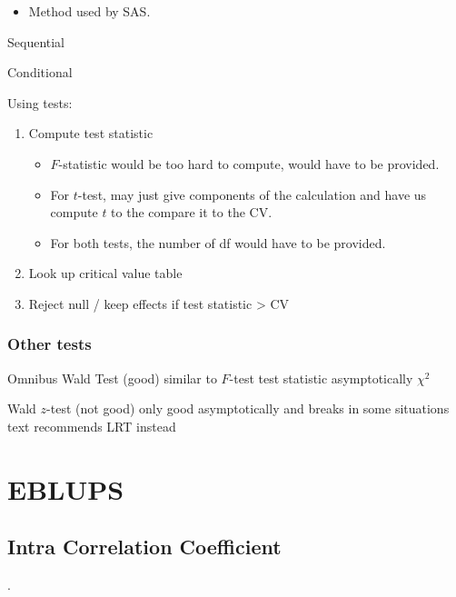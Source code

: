 \documentclass[english]{article}
\begin{document}
\begin{multicols*}{2}
\begin{definitionNOHFILL}[$F$-test]
\begin{definitionNOHFILLpropos}

\begin{itemize}
	\item	Method used by SAS.
\end{itemize}
\end{definitionNOHFILLpropos}

\begin{definitionNOHFILLsub}[Type $I$]
Sequential
\end{definitionNOHFILLsub}

\begin{definitionNOHFILLsub}
Conditional
\end{definitionNOHFILLsub}
\end{definitionNOHFILL}


Using tests:
\begin{enumerate}
	\item	Compute test statistic
		\begin{itemize}
		\item	$F$-statistic would be too hard to compute, would have to be provided.
		\item	For $t$-test, may just give components of the calculation and have us compute $t$ to the compare it to the CV.
		\item	For both tests, the number of df would have to be provided.
		\end{itemize}
	\item	Look up critical value table
	\item	Reject null / keep effects if test statistic > CV
\end{enumerate}

\subsubsection{Other tests}
Omnibus Wald Test (good)
	similar to $F$-test
	test statistic asymptotically $\chi^{2}$
	

Wald $z$-test (not good)
	only good asymptotically and breaks in some situations
	text recommends LRT instead	
	
	
	
\section{EBLUPS}

\subsection{Intra Correlation Coefficient}
.


\end{multicols*}
\end{document}
